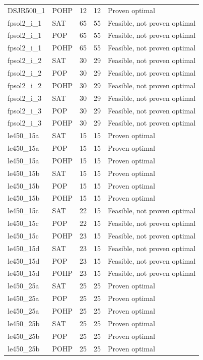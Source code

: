 \begin{longtable}{llrrl}
DSJR500\_1 & POHP & 12 & 12 & Proven optimal \\
fpsol2\_i\_1 & SAT & 65 & 55 & Feasible, not proven optimal \\
fpsol2\_i\_1 & POP & 65 & 55 & Feasible, not proven optimal \\
fpsol2\_i\_1 & POHP & 65 & 55 & Feasible, not proven optimal \\
fpsol2\_i\_2 & SAT & 30 & 29 & Feasible, not proven optimal \\
fpsol2\_i\_2 & POP & 30 & 29 & Feasible, not proven optimal \\
fpsol2\_i\_2 & POHP & 30 & 29 & Feasible, not proven optimal \\
fpsol2\_i\_3 & SAT & 30 & 29 & Feasible, not proven optimal \\
fpsol2\_i\_3 & POP & 30 & 29 & Feasible, not proven optimal \\
fpsol2\_i\_3 & POHP & 30 & 29 & Feasible, not proven optimal \\
le450\_15a & SAT & 15 & 15 & Proven optimal \\
le450\_15a & POP & 15 & 15 & Proven optimal \\
le450\_15a & POHP & 15 & 15 & Proven optimal \\
le450\_15b & SAT & 15 & 15 & Proven optimal \\
le450\_15b & POP & 15 & 15 & Proven optimal \\
le450\_15b & POHP & 15 & 15 & Proven optimal \\
le450\_15c & SAT & 22 & 15 & Feasible, not proven optimal \\
le450\_15c & POP & 22 & 15 & Feasible, not proven optimal \\
le450\_15c & POHP & 23 & 15 & Feasible, not proven optimal \\
le450\_15d & SAT & 23 & 15 & Feasible, not proven optimal \\
le450\_15d & POP & 23 & 15 & Feasible, not proven optimal \\
le450\_15d & POHP & 23 & 15 & Feasible, not proven optimal \\
le450\_25a & SAT & 25 & 25 & Proven optimal \\
le450\_25a & POP & 25 & 25 & Proven optimal \\
le450\_25a & POHP & 25 & 25 & Proven optimal \\
le450\_25b & SAT & 25 & 25 & Proven optimal \\
le450\_25b & POP & 25 & 25 & Proven optimal \\
le450\_25b & POHP & 25 & 25 & Proven optimal \\

\end{longtable}
